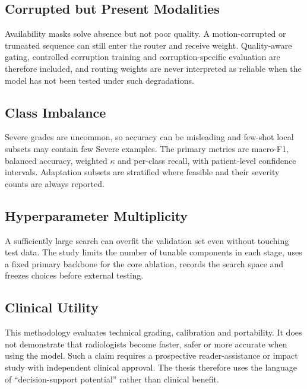 \subsection{Corrupted but Present Modalities}
\label{sec:method-threat-corruption}

Availability masks solve absence but not poor quality. A motion-corrupted or
truncated sequence can still enter the router and receive weight. Quality-aware
gating, controlled corruption training and corruption-specific evaluation are
therefore included, and routing weights are never interpreted as reliable when
the model has not been tested under such degradations.

\subsection{Class Imbalance}
\label{sec:method-threat-imbalance}

Severe grades are uncommon, so accuracy can be misleading and few-shot local
subsets may contain few Severe examples. The primary metrics are macro-F1,
balanced accuracy, weighted $\kappa$ and per-class recall, with patient-level
confidence intervals. Adaptation subsets are stratified where feasible and
their severity counts are always reported.

\subsection{Hyperparameter Multiplicity}
\label{sec:method-threat-hyperparameters}

A sufficiently large search can overfit the validation set even without touching
test data. The study limits the number of tunable components in each stage,
uses a fixed primary backbone for the core ablation, records the search space
and freezes choices before external testing.

\subsection{Clinical Utility}
\label{sec:method-threat-clinical}

This methodology evaluates technical grading, calibration and portability. It
does not demonstrate that radiologists become faster, safer or more accurate
when using the model. Such a claim requires a prospective reader-assistance or
impact study with independent clinical approval. The thesis therefore uses the
language of ``decision-support potential'' rather than clinical benefit.


